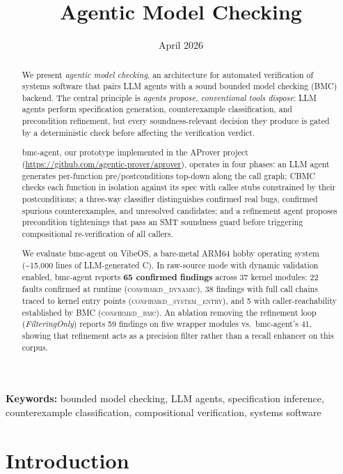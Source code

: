 \documentclass[11pt,a4paper]{article}
\title{\textbf{Agentic Model Checking}}
\date{April 2026}
\newcommand{\tool}{bmc-agent\xspace}
\newcommand{\vibeos}{VibeOS\xspace}
\newcommand{\dynconf}{\textsc{confirmed\_dynamic}\xspace}
\newcommand{\sysconf}{\textsc{confirmed\_system\_entry}\xspace}
\newcommand{\bmcconf}{\textsc{confirmed\_bmc}\xspace}
\begin{document}
\maketitle

\begin{abstract}
We present \emph{agentic model checking}, an architecture for automated
verification of systems software that pairs LLM agents with a sound bounded
model checking (BMC) backend. The central principle is \emph{agents propose,
conventional tools dispose}: LLM agents perform specification generation,
counterexample classification, and precondition refinement, but every
soundness-relevant decision they produce is gated by a deterministic check
before affecting the verification verdict.

\tool, our prototype implemented in the AProver project
(\url{https://github.com/agentic-prover/aprover}), operates in four phases: an LLM agent generates
per-function pre/postconditions top-down along the call graph; CBMC checks
each function in isolation against its spec with callee stubs constrained by
their postconditions; a three-way classifier distinguishes confirmed real bugs,
confirmed spurious counterexamples, and unresolved candidates; and a
refinement agent proposes precondition tightenings that pass an SMT soundness
guard before triggering compositional re-verification of all callers.

We evaluate \tool on \vibeos, a bare-metal ARM64 hobby operating system
(\textasciitilde{}15{,}000 lines of LLM-generated C). In raw-source mode with
dynamic validation enabled, \tool reports \textbf{65 confirmed findings}
across 37 kernel modules: 22 faults confirmed at runtime (\dynconf{}),
38 findings with full call chains traced to kernel entry points
(\sysconf{}), and 5 with caller-reachability established by BMC
(\bmcconf{}). An ablation removing the refinement loop
(\emph{FilteringOnly}) reports 59 findings on five wrapper modules vs.\
\tool's 41, showing that refinement acts as a precision filter rather than a
recall enhancer on this corpus.
\end{abstract}

\noindent\textbf{Keywords:} bounded model checking, LLM agents, specification
inference, counterexample classification, compositional verification, systems
software

\section{Introduction}
\label{sec:intro}
\end{document}
